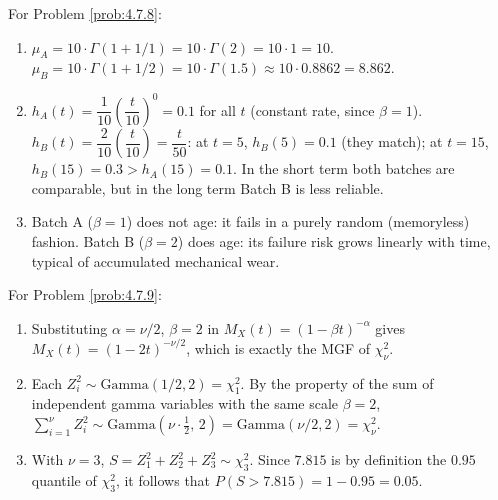 \begin{solucion}
	\label{sol:4.7.8}
	For Problem \ref{prob:4.7.8}:
	\begin{enumerate}
		\item $\mu_A = 10\cdot\Gamma(1+1/1) = 10\cdot\Gamma(2) = 10\cdot 1 = 10$. $\mu_B = 10\cdot\Gamma(1+1/2) = 10\cdot\Gamma(1.5) \approx 10\cdot 0.8862 = 8.862$.
		\item $h_A(t) = \dfrac{1}{10}\left(\dfrac{t}{10}\right)^{0} = 0.1$ for all $t$ (constant rate, since $\beta=1$). $h_B(t) = \dfrac{2}{10}\left(\dfrac{t}{10}\right) = \dfrac{t}{50}$: at $t=5$, $h_B(5)=0.1$ (they match); at $t=15$, $h_B(15)=0.3 > h_A(15)=0.1$. In the short term both batches are comparable, but in the long term Batch B is less reliable.
		\item Batch A ($\beta=1$) does not age: it fails in a purely random (memoryless) fashion. Batch B ($\beta=2$) does age: its failure risk grows linearly with time, typical of accumulated mechanical wear. \quad \qedhere
	\end{enumerate}
\end{solucion}

\begin{solucion}
	\label{sol:4.7.9}
	For Problem \ref{prob:4.7.9}:
	\begin{enumerate}
		\item Substituting $\alpha=\nu/2$, $\beta=2$ in $M_X(t)=(1-\beta t)^{-\alpha}$ gives $M_X(t) = (1-2t)^{-\nu/2}$, which is exactly the MGF of $\chi^{2}_{\nu}$.
		\item Each $Z_i^{2} \sim \text{Gamma}(1/2,2) = \chi^{2}_{1}$. By the property of the sum of independent gamma variables with the same scale $\beta=2$, $\sum_{i=1}^{\nu} Z_i^{2} \sim \text{Gamma}\!\left(\nu\cdot\tfrac{1}{2},\,2\right) = \text{Gamma}(\nu/2,2) = \chi^{2}_{\nu}$.
		\item With $\nu=3$, $S=Z_1^{2}+Z_2^{2}+Z_3^{2}\sim\chi^{2}_{3}$. Since $7.815$ is by definition the $0.95$ quantile of $\chi^{2}_{3}$, it follows that $P(S>7.815) = 1-0.95 = 0.05$. \quad \qedhere
	\end{enumerate}
\end{solucion}

